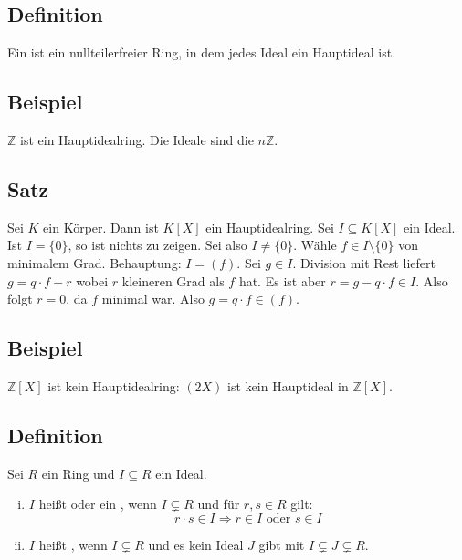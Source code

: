 \subsection[Definition: Hauptidealring]{Definition} %
\label{sub:67}
Ein  ist ein nullteilerfreier Ring, in dem jedes Ideal ein Hauptideal ist.

\subsection[Beispiel eines Hauptidealringes]{Beispiel} %
\label{sub:68}
$\mathds{Z}$ ist ein Hauptidealring. Die Ideale sind die $n \mathds{Z}$.

\subsection[Satz: Polynomringe über einen Körper sind Hauptidealringe]{Satz} %
\label{sub:69}
Sei $K$ ein Körper. Dann ist $K[X]$ ein Hauptidealring.
Sei $I \subseteq K[X]$ ein Ideal. Ist $I=\{0\}$, so ist nichts zu zeigen. Sei also $I \not= \{0\}$. Wähle $f \in I \setminus \{0\}$ von minimalem Grad. Behauptung: $I= (f)$.
Sei $g \in I$. Division mit Rest liefert $g = q \cdot f +r$ wobei $r$ kleineren Grad als $f$ hat. Es ist aber $r = g - q \cdot f \in I$. Also folgt $r=0$, da $f$ minimal war.
Also $g = q \cdot f \in (f)$. \bewende

\subsection[{Beispiel: $\mathds{Z}[X]$ ist kein Hauptidealring}]{Beispiel} %
\label{sub:610}
$\mathds{Z}[X]$ ist kein Hauptidealring: $(2X)$ ist kein Hauptideal in $\mathds{Z}[X]$.

\subsection[Definition: Primideal und maximales Ideal]{Definition} %
\label{sub:611}
Sei $R$ ein Ring und $I \subseteq R$ ein Ideal.
\begin{enumerate}[(i)]
	\item $I$ heißt  oder ein , wenn  $I \subsetneq R$ und für $r,s \in R$ gilt:
	\[
		r \cdot s \in I \Longrightarrow r \in I \text{ oder } s \in I
	\]
	\item $I$ heißt , wenn $I \subsetneq R$ und es kein Ideal $J$ gibt mit $I \subsetneq J \subsetneq R$. 
\end{enumerate}

